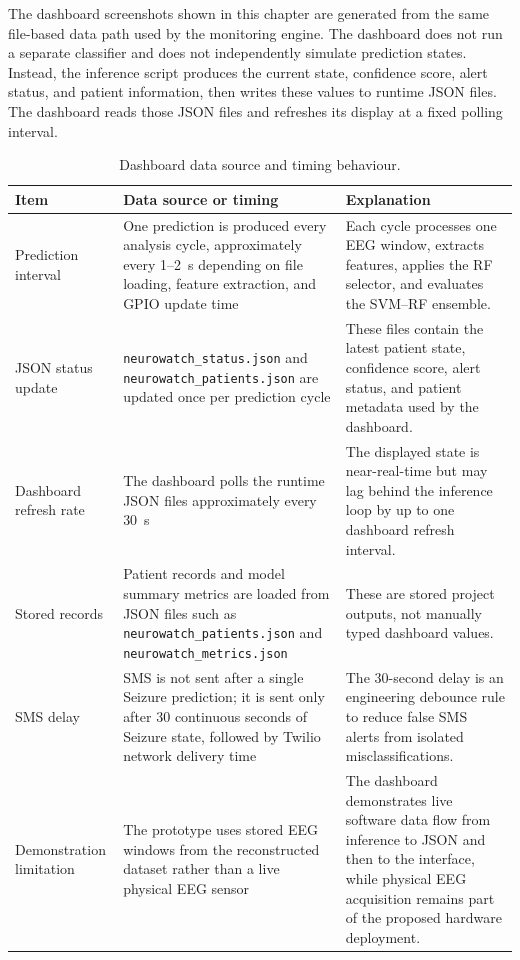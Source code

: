 \documentclass[12pt, a4paper]{report}
\begin{document}
The dashboard screenshots shown in this chapter are generated from the same
file-based data path used by the monitoring engine. The dashboard does not
run a separate classifier and does not independently simulate prediction
states. Instead, the inference script produces the current state, confidence
score, alert status, and patient information, then writes these values to
runtime JSON files. The dashboard reads those JSON files and refreshes its
display at a fixed polling interval.

\begin{table}[H]
  \centering
  \caption{Dashboard data source and timing behaviour.}
  \label{tab:dashboard_data_timing}
  \footnotesize
  \renewcommand{\arraystretch}{1.18}
  \begin{tabularx}{\textwidth}{>{\raggedright\arraybackslash}p{3.2cm}
                              >{\raggedright\arraybackslash}p{4.5cm}
                              >{\raggedright\arraybackslash}X}
    \toprule
    \textbf{Item} & \textbf{Data source or timing} & \textbf{Explanation} \\
    \midrule
    Prediction interval &
    One prediction is produced every analysis cycle, approximately every
    1--2~s depending on file loading, feature extraction, and GPIO update time &
    Each cycle processes one EEG window, extracts features, applies the
    RF selector, and evaluates the SVM--RF ensemble. \\
    JSON status update &
    \texttt{neurowatch\_status.json} and
    \texttt{neurowatch\_patients.json} are updated once per prediction cycle &
    These files contain the latest patient state, confidence score, alert
    status, and patient metadata used by the dashboard. \\
    Dashboard refresh rate &
    The dashboard polls the runtime JSON files approximately every 30~s &
    The displayed state is near-real-time but may lag behind the inference
    loop by up to one dashboard refresh interval. \\
    Stored records &
    Patient records and model summary metrics are loaded from JSON files such
    as \texttt{neurowatch\_patients.json} and
    \texttt{neurowatch\_metrics.json} &
    These are stored project outputs, not manually typed dashboard values. \\
    SMS delay &
    SMS is not sent after a single Seizure prediction; it is sent only after
    30 continuous seconds of Seizure state, followed by Twilio network
    delivery time &
    The 30-second delay is an engineering debounce rule to reduce false SMS
    alerts from isolated misclassifications. \\
    Demonstration limitation &
    The prototype uses stored EEG windows from the reconstructed dataset
    rather than a live physical EEG sensor &
    The dashboard demonstrates live software data flow from inference to JSON
    and then to the interface, while physical EEG acquisition remains part of
    the proposed hardware deployment. \\
    \bottomrule
  \end{tabularx}
\end{table}
\end{document}
